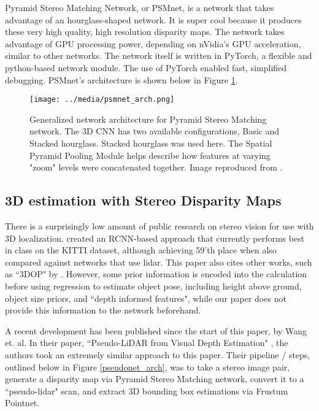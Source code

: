 Pyramid Stereo Matching Network, or PSMnet, is a network that takes advantage of an hourglass-shaped network. It is super cool because it produces these very high quality, high resolution disparity maps. The network takes advantage of GPU processing power, depending on nVidia's GPU acceleration, similar to other networks. The network itself is written in PyTorch, a flexible and python-based network module. The use of PyTorch enabled fast, simplified debugging. PSMnet's architecture is shown below in Figure \ref{psmnet_arch}. 


\begin{figure}[h]
    \texttt{[image: ../media/psmnet\_arch.png]}
    \caption{Generalized network architecture for Pyramid Stereo Matching network. The 3D CNN has two available configurations, Basic and Stacked hourglass. Stacked hourglass was used here. The Spatial Pyramid Pooling Module helps describe how features at varying "zoom" levels were concatenated together. Image reproduced from \cite{chang_pyramid_2018}.}
    \label{psmnet_arch} 
\end{figure}

\subsection{3D estimation with Stereo Disparity Maps}
There is a surprisingly low amount of public research on stereo vision for use with 3D localization. \cite{li_stereo_2019} created an RCNN-based approach that currently performs best in class on the KITTI dataset, although achieving 59'th place when also compared against networks that use lidar. This paper also cites other works, such as ``3DOP" by \cite{chen_3d_2016}. However, some prior information is encoded into the calculation before using regression to estimate object pose, including height above ground, object size priors, and ``depth informed features", while our paper does not provide this information to the network beforehand.

A recent development has been published since the start of this paper, by Wang et. al. In their paper, ``Pseudo-LiDAR from Visual Depth Estimation" \cite{wang_pseudo-lidar_2019}, the authors took an extremely similar approach to this paper. Their pipeline / steps, outlined below in Figure \ref{pseudonet_arch}, was to take a stereo image pair, generate a disparity map via Pyramid Stereo Matching network, convert it to a ``pseudo-lidar" scan, and extract 3D bounding box estimations via Frustum Pointnet. \\

